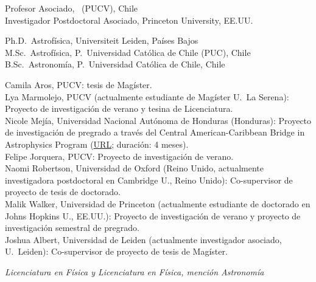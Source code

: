 \documentclass[11pt]{article}
\begin{document}

\noindent
{} Profesor Asociado, \pucv\ (PUCV), Chile\\
 Investigador Postdoctoral Asociado, Princeton University, EE.UU.



\noindent
{} Ph.D.~Astrofísica, Universiteit Leiden, Países Bajos\\
 M.Sc.~Astrofísica, P.~Universidad Cat\'olica de Chile (PUC), Chile\\
 B.Sc.~Astronomía, P.~Universidad Cat\'olica de Chile, Chile\\




 Camila Aros, PUCV: tesis de Magíster.\\
 Lya Marmolejo, PUCV (actualmente estudiante de Magíster U.\ La Serena): Proyecto de investigación de 
verano y tesina de Licenciatura.\\
 Nicole Mej\'ia, Universidad Nacional Aut\'onoma de Honduras 
(Honduras): Proyecto de investigación de pregrado a través del Central American-Caribbean Bridge in Astrophysics Program
    (\href{https://cencabridgeastro.weebly.com/our-team.html}{URL}; duración: 4 meses).\\
 Felipe Jorquera, PUCV: Proyecto de investigación de verano.\\
 Naomi Robertson, Universidad de Oxford (Reino Unido, actualmente investigadora
postdoctoral en Cambridge U., Reino Unido): Co-supervisor de proyecto de tesis de doctorado.\\
 Malik Walker, Universidad de Princeton (actualmente estudiante de doctorado en
Johns Hopkins U., EE.UU.): Proyecto de investigación de verano y proyecto de investigación semestral de pregrado.\\
 Joshua Albert, Universidad de Leiden (actualmente investigador asociado, U.\ Leiden): Co-supervisor de 
proyecto de tesis de Magíster.



\noindent
\emph{Licenciatura en Física y Licenciatura en Física, mención Astronomía}
\end{document}
